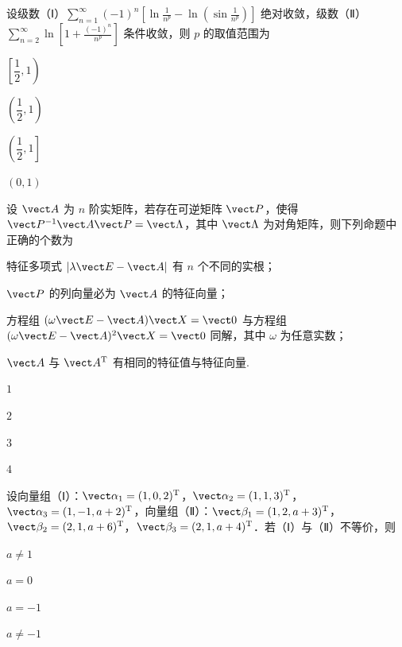 \begin{question}[index=4]
设级数（Ⅰ）$\displaystyle\sum_{n=1}^\infty(-1)^n\left[\ln\frac1{n^p}-\ln\!\left(\sin\frac1{n^p}\right)\right]$ 绝对收敛，级数（Ⅱ）$\displaystyle\sum_{n=2}^\infty\ln\left[1+\frac{(-1)^n}{n^p}\right]$ 条件收敛，则 $p$ 的取值范围为
\begin{choices}[columns=2]
\item $\left[\dfrac12,1\right)$
\item $\left(\dfrac12,1\right)$
\item $\left(\dfrac12,1\right]$
\item $(0,1)$
\end{choices}
\end{question}
\QuestionBreak

\begin{question}[index=5]
设 $\vect A$ 为 $n$ 阶实矩阵，若存在可逆矩阵 $\vect P$，使得 $\vect P^{-1}\vect A\vect P=\vect\Lambda$，其中 $\vect\Lambda$ 为对角矩阵，则下列命题中正确的个数为
\par{} 特征多项式 $|\lambda\vect E-\vect A|$ 有 $n$ 个不同的实根；
\par{} $\vect P$ 的列向量必为 $\vect A$ 的特征向量；
\par{} 方程组 $(\omega\vect E-\vect A)\vect X=\vect0$ 与方程组 $(\omega\vect E-\vect A)^2\vect X=\vect0$ 同解，其中 $\omega$ 为任意实数；
\par{} $\vect A$ 与 $\vect A^{\mathrm T}$ 有相同的特征值与特征向量.
\begin{choices}[columns=4]
\item $1$
\item $2$
\item $3$
\item $4$
\end{choices}
\end{question}
\QuestionBreak

\begin{question}[index=6]
设向量组（Ⅰ）：$\vect\alpha_1=(1,0,2)^{\mathrm T}$，$\vect\alpha_2=(1,1,3)^{\mathrm T}$，$\vect\alpha_3=(1,-1,a+2)^{\mathrm T}$，向量组（Ⅱ）：$\vect\beta_1=(1,2,a+3)^{\mathrm T}$，$\vect\beta_2=(2,1,a+6)^{\mathrm T}$，$\vect\beta_3=(2,1,a+4)^{\mathrm T}$．若（Ⅰ）与（Ⅱ）不等价，则
\begin{choices}[columns=4]
\item $a\ne1$
\item $a=0$
\item $a=-1$
\item $a\ne-1$
\end{choices}
\end{question}
\QuestionBreak

